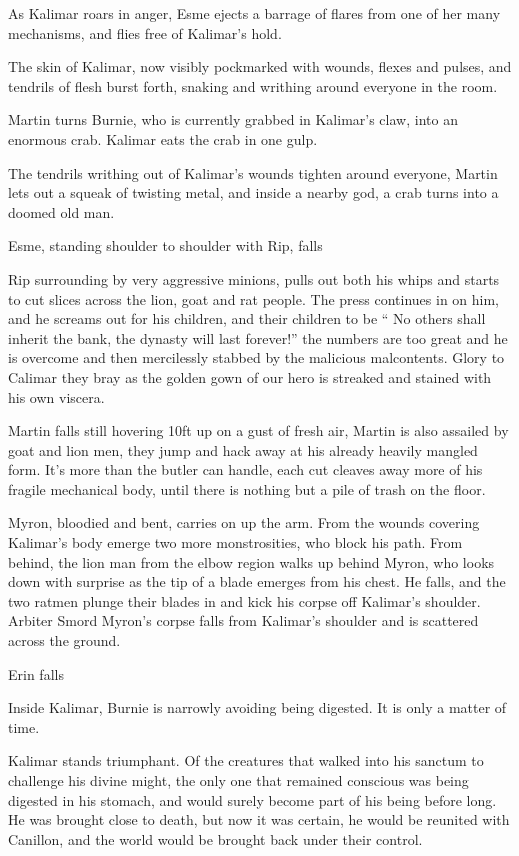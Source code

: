As Kalimar roars in anger, Esme ejects a barrage of flares from one of her many mechanisms, and flies free of Kalimar’s hold.\medskip

The skin of Kalimar, now visibly pockmarked with wounds, flexes and pulses, and tendrils of flesh burst forth, snaking and writhing around everyone in the room.\medskip

Martin turns Burnie, who is currently grabbed in Kalimar’s claw, into an enormous crab. Kalimar eats the crab in one gulp.\medskip

The tendrils writhing out of Kalimar’s wounds tighten around everyone, Martin lets out a squeak of twisting metal, and inside a nearby god, a crab turns into a doomed old man.\medskip

Esme, standing shoulder to shoulder with Rip, falls\medskip

Rip surrounding by very aggressive minions, pulls out both his whips and starts to cut slices across the lion, goat and rat people. The press continues in on him, and he screams out for his children, and their children to be “ No others shall inherit the bank, the dynasty will last forever!” the numbers are too great and he is overcome and then mercilessly stabbed by the malicious malcontents. Glory to Calimar they bray as the golden gown of our hero is streaked and stained with his own viscera.\medskip

Martin falls still hovering 10ft up on a gust of fresh air, Martin is also assailed by goat and lion men, they jump and hack away at his already heavily mangled form. It’s more than the butler can handle, each cut cleaves away more of his fragile mechanical body, until there is nothing but a pile of trash on the floor.\medskip

Myron, bloodied and bent, carries on up the arm. From the wounds covering Kalimar’s body emerge two more monstrosities, who block his path. From behind, the lion man from the elbow region walks up behind Myron, who looks down with surprise as the tip of a blade emerges from his chest. He falls, and the two ratmen plunge their blades in and kick his corpse off Kalimar’s shoulder. Arbiter Smord Myron’s corpse falls from Kalimar’s shoulder and is scattered across the ground.\medskip

Erin falls\medskip

Inside Kalimar, Burnie is narrowly avoiding being digested. It is only a matter of time.\medskip

Kalimar stands triumphant. Of the creatures that walked into his sanctum to challenge his divine might, the only one that remained conscious was being digested in his stomach, and would surely become part of his being before long. He was brought close to death, but now it was certain, he would be reunited with Canillon, and the world would be brought back under their control.\medskip

